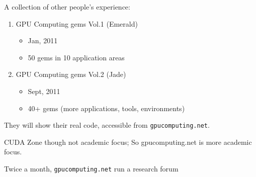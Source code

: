 A collection of other people's experience:
\begin{enumerate}
\item GPU Computing gems Vol.1 (Emerald)
  \begin{itemize}
  \item Jan, 2011
  \item 50 gems in 10 application areas
  \end{itemize}
\item GPU Computing gems Vol.2 (Jade)
  \begin{itemize}
  \item Sept, 2011
  \item 40+ gems (more applications, tools, environments)
  \end{itemize}
\end{enumerate}
They will show their real code, accessible from
\verb!gpucomputing.net!.



CUDA Zone though not academic focus; So gpucomputing.net is more
academic focus. 

Twice a month, \verb!gpucomputing.net! run a research forum




